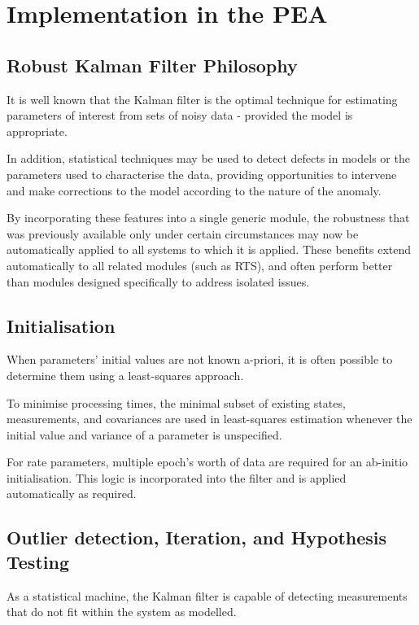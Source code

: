 \section{Implementation in the PEA}

\subsection{Robust Kalman Filter Philosophy}

It is well known that the Kalman filter is the optimal technique for estimating parameters of interest from sets of noisy data - provided the model is appropriate.

In addition, statistical techniques may be used to detect defects in models or the parameters used to characterise the data, providing opportunities to intervene and make corrections to the model according to the nature of the anomaly.

By incorporating these features into a single generic module, the robustness that was previously available only under certain circumstances may now be automatically applied to all systems to which it is applied. These benefits extend automatically to all related modules (such as RTS), and often perform better than modules designed specifically to address isolated issues.

\subsection{Initialisation}

When parameters' initial values are not known a-priori, it is often possible to determine them using a least-squares approach.

To minimise processing times, the minimal subset of existing states, measurements, and covariances are used in least-squares estimation whenever the initial value and variance of a parameter is unspecified.

For rate parameters, multiple epoch’s worth of data are required for an ab-initio initialisation. This logic is incorporated into the filter and is applied automatically as required.

\subsection{Outlier detection, Iteration, and Hypothesis Testing}

As a statistical machine, the Kalman filter is capable of detecting measurements that do not fit within the system as modelled.

